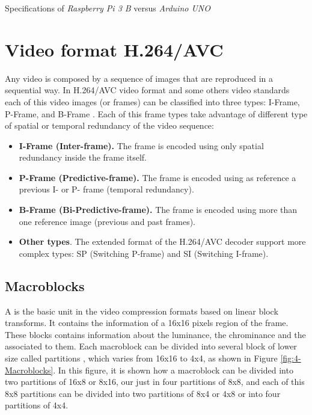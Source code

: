 \begin{table}[!h]
	\centering
	{\small
		
	}
	\caption{Specifications of \textit{Raspberry Pi 3 B} versus \textit{Arduino UNO}}
	\label{tab:raspberry-vs-arduino}
\end{table}


\section{Video format H.264/AVC}
\label{subsect:H.264}
Any video is composed by a sequence of images that are reproduced in a sequential way. In H.264/AVC video format and some others video standards each of this video images (or frames) can be classified into three types: I-Frame, P-Frame, and B-Frame \cite{SC11}. Each of this frame types take advantage of different type of spatial or temporal redundancy of the video sequence: 
\begin{itemize}
	\item \textbf{I-Frame (Inter-frame).} The frame is encoded using only spatial redundancy inside the frame itself.
	\item \textbf{P-Frame (Predictive-frame).} The frame is encoded using as reference a previous I- or P- frame (temporal redundancy).
	\item \textbf{B-Frame (Bi-Predictive-frame).} The frame is encoded using more than one reference image (previous and past frames).
	\item \textbf{Other types}. The extended format of the H.264/AVC decoder support more complex types: SP (Switching P-frame) and SI (Switching I-frame).
\end{itemize}

\subsection{Macroblocks}
\label{subsect:Macroblocks}
A  is the basic unit in the video compression formats based on linear block transforms. It contains the information of a 16x16 pixels region of the frame. These blocks contains information about the luminance, the chrominance and the  associated to them. Each macroblock can be divided into several block of lower size called partitions \cite{Gir14}, which varies from 16x16 to 4x4, as shown in Figure \ref{fig:4-Macroblocks}. In this figure, it is shown how a macroblock can be divided into two partitions of 16x8 or 8x16, our just in four partitions of 8x8, and each of this 8x8 partitions can be divided into two partitions of 8x4 or 4x8 or into four partitions of 4x4.

